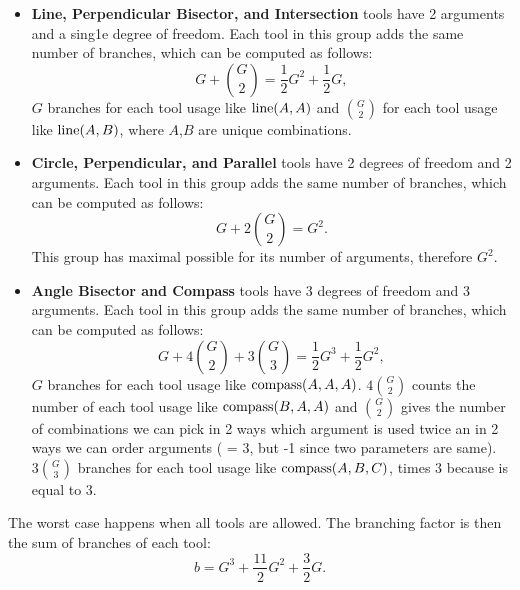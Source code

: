 \begin{itemize}
    \item \textbf{Line, Perpendicular Bisector, and Intersection} tools have 2 arguments and a sing1e degree of freedom. Each tool in this group adds the same number of branches, which can be computed as follows:
    \begin{equation}
    G + {G \choose 2} = \frac{1}{2}G^2 + \frac{1}{2}G,
    \end{equation}
    $G$ branches for each tool usage like $\operatorname{line}(A,A)$ and ${G \choose 2}$ for each tool usage like $\operatorname{line}(A,B)$, where $A$,$B$ are unique combinations. 
    \item \textbf{Circle, Perpendicular, and Parallel} tools have 2 degrees of freedom and 2 arguments. Each tool in this group adds the same number of branches, which can be computed as follows:
    \begin{equation}
    G + 2{G \choose 2 } = G^2.
    \end{equation}
    This group has maximal possible \DOF{} for its number of arguments, therefore $G^2$.
    \item \textbf{Angle Bisector and Compass} tools have 3 degrees of freedom and 3 arguments. Each tool in this group adds the same number of branches, which can be computed as follows:
    \begin{equation}
    G + 4 {G \choose 2} + 3 {G \choose 3} = \frac{1}{2}G^3 + \frac{1}{2}G^2 , 
    \end{equation}
    $G$ branches for each tool usage like $\operatorname{compass}(A,A,A)$. $4{G \choose 2}$ counts the number of each tool usage like $\operatorname{compass}(B,A,A)$ and ${G \choose 2}$ gives the number of combinations we can pick in 2 ways which argument is used twice an in 2 ways we can order arguments (\DOF{} = 3, but -1 since two parameters are same). $3{G \choose 3}$ branches for each tool usage like $\operatorname{compass}(A,B,C)$, times 3 because \DOF{} is equal to 3.
\end{itemize}
The worst case happens when all tools are allowed. The branching factor is then the sum of branches of each tool:
\begin{equation}
b =  G^3 + \frac{11}{2}G^2 + \frac{3}{2}G.
\end{equation}


